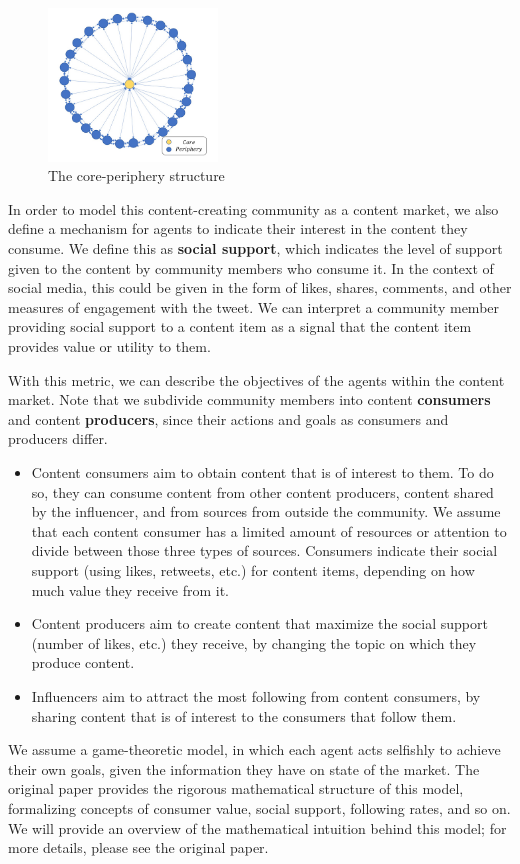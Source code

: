 \documentclass[11pt, letterpaper]{article}
\begin{document}
\begin{figure}[h]
    \centering
    \includegraphics[width=0.4\textwidth]{figures/core-periphery.png}
    \caption{The core-periphery structure}
    \label{fig:core-periphery}
\end{figure}

In order to model this content-creating community as a content market, we also define a mechanism for agents to indicate their interest in the content they consume. We define this as \textbf{social support}, which indicates the level of support given to the content by community members who consume it. In the context of social media, this could be given in the form of likes, shares, comments, and other measures of engagement with the tweet. We can interpret a community member providing social support to a content item as a signal that the content item provides value or utility to them.

With this metric, we can describe the objectives of the agents within the content market. Note that we subdivide community members into content \textbf{consumers} and content \textbf{producers}, since their actions and goals as consumers and producers differ.
\begin{itemize}
    \item Content consumers aim to obtain content that is of interest to them. To do so, they can consume content from other content producers, content shared by the influencer, and from sources from outside the community. We assume that each content consumer has a limited amount of resources or attention to divide between those three types of sources. Consumers indicate their social support (using likes, retweets, etc.) for content items, depending on how much value they receive from it.
    \item Content producers aim to create content that maximize the social support (number of likes, etc.) they receive, by changing the topic on which they produce content.
    \item Influencers aim to attract the most following from content consumers, by sharing content that is of interest to the consumers that follow them. 
\end{itemize}
We assume a game-theoretic model, in which each agent acts selfishly to achieve their own goals, given the information they have on state of the market. The original paper provides the rigorous mathematical structure of this model, formalizing concepts of consumer value, social support, following rates, and so on. We will provide an overview of the mathematical intuition behind this model; for more details, please see the original paper.
\end{document}
